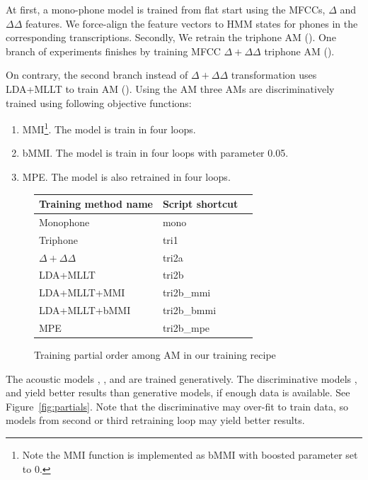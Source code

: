 At first, a mono-phone model is trained from flat start using the MFCCs, $\Delta$ and $\Delta \Delta$ features.
We force-align the feature vectors to HMM states for phones in the corresponding transcriptions.
Secondly, We retrain the triphone \ac{AM} ().
One branch of experiments finishes by training \ac{MFCC} $\Delta + \Delta\Delta$ triphone \ac{AM} (). %

On contrary, the second branch instead of $\Delta + \Delta\Delta$ transformation uses \ac{LDA}+\ac{MLLT} to train \ac{AM} ().
Using the \ac{AM}  three \acp{AM} are discriminatively trained using following objective functions:
\begin{enumerate}
    \item \acl{MMI}\cite{chow1990maximum}\footnote{Note the \ac{MMI} function is implemented as \acs{bMMI} with boosted parameter set to 0.}. The model is train in four loops.
    \item \acl{bMMI}\cite{povey2008boosted}. The model  is train in four loops with parameter 0.05.
    \item \acl{MPE}\cite{povey2003mmi}. The model  is also retrained in four loops.
\end{enumerate}

\begin{figure}[!htp]
    \begin{center}
    
    \small{\begin{tabular}{lll}
    \hline
    Training method name & Script shortcut \\
    \hline
    Monophone & mono \\
    Triphone  & tri1 \\
    $\Delta + \Delta\Delta$ & tri2a  \\
    \acs{LDA}+\acs{MLLT} & tri2b  \\
    \acs{LDA}+\acs{MLLT}+\acs{MMI} & tri2b\_mmi \\
    \acs{LDA}+\acs{MLLT}+\acs{bMMI} & tri2b\_bmmi \\
    \acs{MPE} & tri2b\_mpe \\
    \hline
    \end{tabular}}
    \end{center}
    \caption{Training partial order among \ac{AM} in our training recipe}
    \label{fig:am-deps} 
\end{figure}

The acoustic models , , 
and  are trained generatively.
The discriminative models ,  and  yield better results than generative models, if enough data is available. 
See Figure~\ref{fig:partials}.
Note that the discriminative may over-fit to train data, so models from second or third retraining loop may yield better results. 

